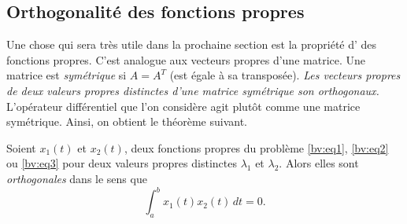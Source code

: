 \subsection{Orthogonalité des fonctions propres}

Une chose qui sera très utile dans la prochaine section est la propriété d'\emph{} des fonctions propres. C'est analogue aux vecteurs propres d'une matrice. Une matrice est 
\emph{symétrique}
si $A = A^T$ (est égale à sa transposée).
\emph{Les vecteurs propres de deux valeurs propres distinctes d'une matrice symétrique son orthogonaux.}
L'opérateur différentiel que l'on considère agit plutôt comme  une matrice symétrique. Ainsi, on obtient le théorème suivant.  

%
%
%

\begin{theorem} \label{bvp:orthogonaleigen}
Soient  $x_1(t)$ et $x_2(t)$,  deux fonctions propres du problème 
\eqref{bv:eq1}, \eqref{bv:eq2} ou \eqref{bv:eq3}
pour deux valeurs propres distinctes $\lambda_1$ et $\lambda_2$.  Alors elles sont
\emph{orthogonales }
dans le sens que
\begin{equation*}
\int_a^b x_1(t) x_2(t) \,dt = 0 .
\end{equation*}
\end{theorem}

